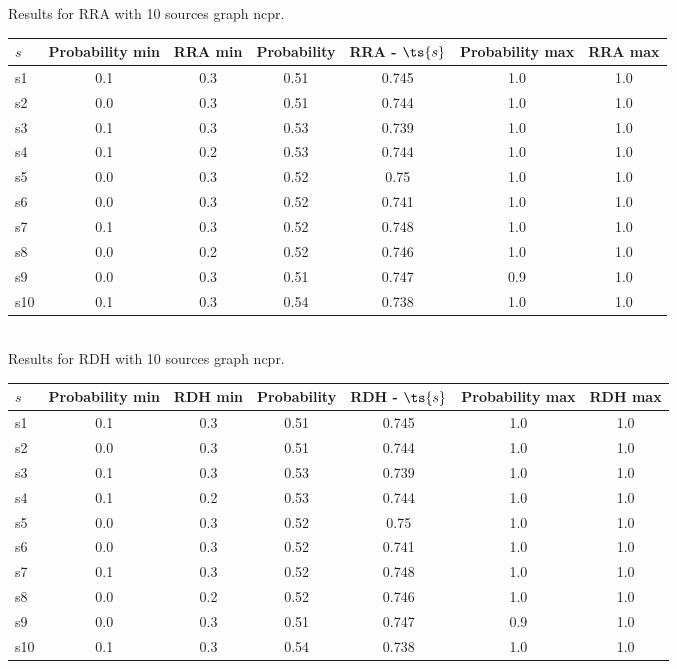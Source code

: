 \documentclass{article}
\begin{document}
\noindent Results for RRA with 10 sources graph ncpr.

\noindent\begin{tabular}{|l|c|c|c|c|c|c|}
\hline
$s$& Probability min & RRA min & Probability & RRA - $\ts{s}$ & Probability max & RRA max\\
\hline
s1 &0.1 & 0.3 & 0.51 & 0.745 & 1.0 & 1.0\\
\hline
s2 &0.0 & 0.3 & 0.51 & 0.744 & 1.0 & 1.0\\
\hline
s3 &0.1 & 0.3 & 0.53 & 0.739 & 1.0 & 1.0\\
\hline
s4 &0.1 & 0.2 & 0.53 & 0.744 & 1.0 & 1.0\\
\hline
s5 &0.0 & 0.3 & 0.52 & 0.75 & 1.0 & 1.0\\
\hline
s6 &0.0 & 0.3 & 0.52 & 0.741 & 1.0 & 1.0\\
\hline
s7 &0.1 & 0.3 & 0.52 & 0.748 & 1.0 & 1.0\\
\hline
s8 &0.0 & 0.2 & 0.52 & 0.746 & 1.0 & 1.0\\
\hline
s9 &0.0 & 0.3 & 0.51 & 0.747 & 0.9 & 1.0\\
\hline
s10 &0.1 & 0.3 & 0.54 & 0.738 & 1.0 & 1.0\\
\hline
\end{tabular}\\

\noindent Results for RDH with 10 sources graph ncpr.

\noindent\begin{tabular}{|l|c|c|c|c|c|c|}
\hline
$s$& Probability min & RDH min & Probability & RDH - $\ts{s}$ & Probability max & RDH max\\
\hline
s1 &0.1 & 0.3 & 0.51 & 0.745 & 1.0 & 1.0\\
\hline
s2 &0.0 & 0.3 & 0.51 & 0.744 & 1.0 & 1.0\\
\hline
s3 &0.1 & 0.3 & 0.53 & 0.739 & 1.0 & 1.0\\
\hline
s4 &0.1 & 0.2 & 0.53 & 0.744 & 1.0 & 1.0\\
\hline
s5 &0.0 & 0.3 & 0.52 & 0.75 & 1.0 & 1.0\\
\hline
s6 &0.0 & 0.3 & 0.52 & 0.741 & 1.0 & 1.0\\
\hline
s7 &0.1 & 0.3 & 0.52 & 0.748 & 1.0 & 1.0\\
\hline
s8 &0.0 & 0.2 & 0.52 & 0.746 & 1.0 & 1.0\\
\hline
s9 &0.0 & 0.3 & 0.51 & 0.747 & 0.9 & 1.0\\
\hline
s10 &0.1 & 0.3 & 0.54 & 0.738 & 1.0 & 1.0\\
\hline
\end{tabular}\\
\end{document}
